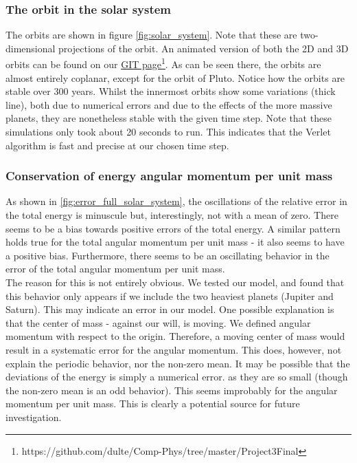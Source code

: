 \documentclass[a4paper, 10pt]{article}
\begin{document}
\subsubsection{The orbit in the solar system}
The orbits are shown in figure \cref{fig:solar_system}. Note that these are two-dimensional projections of the orbit. An animated version of both the 2D and 3D orbits can be found on our \href{https://github.com/dulte/Comp-Phys/tree/master/Project3Final}{GIT page}\footnote{https://github.com/dulte/Comp-Phys/tree/master/Project3Final}. As can be seen there, the orbits are almost entirely coplanar, except for the orbit of Pluto. Notice how the orbits are stable over 300 years. Whilst the innermost orbits show some variations (thick line), both due to numerical errors and due to the effects of the more massive planets, they are nonetheless stable with the given time step. Note that these simulations only took about 20 seconds to run. This indicates that the Verlet algorithm is fast and precise at our chosen time step.
\subsubsection{Conservation of energy angular momentum per unit mass}
As shown in \cref{fig:error_full_solar_system}, the oscillations of the relative error in the total energy is minuscule but, interestingly, not with a mean of zero. There seems to be a bias towards positive errors of the total energy. A similar pattern holds true for the total angular momentum per unit mass - it also seems to have a positive bias. Furthermore, there seems to be an oscillating behavior in the error of the total angular momentum per unit mass.\\
\linebreak
The reason for this is not entirely obvious. We tested our model, and found that this behavior only appears if we include the two heaviest planets (Jupiter and Saturn). This may indicate an error in our model. One possible explanation is that the center of mass - against our will, is moving. We defined angular momentum with respect to the origin. Therefore, a moving center of mass would result in a systematic error for the angular momentum. This does, however, not explain the periodic behavior, nor the non-zero mean. It may be possible that the deviations of the energy is simply a numerical error. as they are so small (though the non-zero mean is an odd behavior). This seems improbably for the angular momentum per unit mass. This is clearly a potential source for future investigation.
\end{document}

